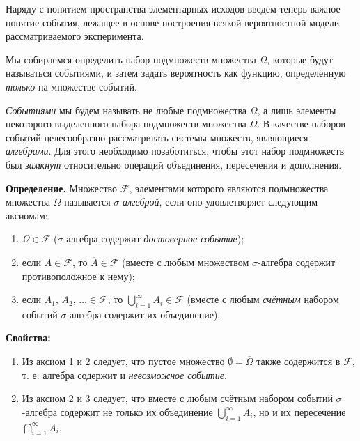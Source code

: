 \documentclass[11pt,a4paper]{article}
\providecommand{\tightlist}{%
      \setlength{\itemsep}{0pt}\setlength{\parskip}{0pt}}
\begin{document}
Наряду с понятием пространства элементарных исходов введём теперь важное
понятие события, лежащее в основе построения всякой вероятностной модели
рассматриваемого эксперимента.

Мы собираемся определить набор подмножеств множества \(\Omega\), которые
будут называться событиями, и затем задать вероятность как функцию,
определённую \emph{только} на множестве событий.

\emph{Событиями} мы будем называть не любые подмножества \(\Omega\), а
лишь элементы некоторого выделенного набора подмножеств множества
\(\Omega\). В качестве наборов событий целесообразно рассматривать
системы множеств, являющиеся \emph{алгебрами}. Для этого необходимо
позаботиться, чтобы этот набор подмножеств был \emph{замкнут}
относительно операций объединения, пересечения и дополнения.

\textbf{Определение.} Множество \(\mathcal{F}\), элементами которого
являются подмножества множества \(\Omega\) называется
\(\sigma\)-\emph{алгеброй}, если оно удовлетворяет следующим аксиомам:

\begin{enumerate}
\def\labelenumi{\arabic{enumi}.}
\tightlist
\item
  \(\Omega \in \mathcal{F}\) (\(\sigma\)-алгебра содержит
  \emph{достоверное событие});
\item
  если \(A \in \mathcal{F}\), то \(\overline{A} \in \mathcal{F}\)
  (вместе с любым множеством \(\sigma\)-алгебра содержит противоположное
  к нему);
\item
  если \(A_1,\,A_2,\,\ldots \in \mathcal{F}\), то
  \(\bigcup\limits_{i=1}^{\infty}A_i \in \mathcal{F}\) (вместе с любым
  \emph{счётным} набором событий \(\sigma\)-алгебра содержит их
  объединение).
\end{enumerate}

    \textbf{Свойства:}

\begin{enumerate}
\def\labelenumi{\arabic{enumi}.}
\tightlist
\item
  Из аксиом 1 и 2 следует, что пустое множество
  \(\emptyset = \overline{\Omega}\) также содержится в \(\mathcal{F}\),
  т. е. алгебра содержит и \emph{невозможное событие}.\\
\item
  Из аксиом 2 и 3 следует, что вместе с любым счётным набором событий
  \(\sigma\)-алгебра содержит не только их объединение
  \(\bigcup\limits_{i=1}^{\infty}A_i\), но и их пересечение
  \(\bigcap\limits_{i=1}^{\infty}A_i\).
\end{enumerate}
\end{document}
